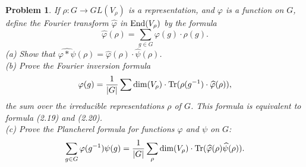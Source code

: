 \documentclass{article}
\newcommand{\End}{\textup{End}}
\newcommand{\tr}{\textup{Tr}}
\newtheorem{problem}{Problem}
\begin{document}
\begin{problem}
If $\rho : G \to GL(V_{\rho})$ is a representation, and $\varphi$ is a function on $G$, define the \emph{Fourier transform} $\widehat{\varphi}$ in $\End(V_{\rho})$ by the formula
\[
\widehat{\varphi}(\rho) = \sum_{g \in G} \varphi(g) \cdot \rho(g).
\]
(a) Show that $\widehat{\varphi * \psi}(\rho) = \widehat{\varphi}(\rho) \cdot \widehat{\psi}(\rho)$.\\
(b) Prove the \emph{Fourier inversion formula}
\[
\varphi(g) = \frac{1}{|G|} \sum \dim (V_{\rho}) \cdot \tr(\rho(g^{-1}) \cdot \widehat{\varphi}(\rho)),
\]
the sum over the irreducible representations $\rho$ of $G$. This formula is equivalent to formula (2.19) and (2.20).\\
(c) Prove the \emph{Plancherel formula} for functions $\varphi$ and $\psi$ on $G$:
\[
\sum_{g \in G} \varphi(g^{-1}) \psi(g) = \frac{1}{|G|} \sum_{\rho} \dim (V_{\rho}) \cdot \tr (\widehat{\varphi}(\rho) \widehat{\psi} (\rho)).
\]
\end{problem}
\end{document}
